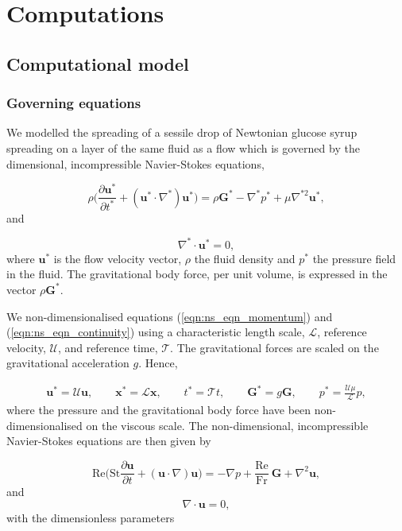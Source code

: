 \documentclass[aip,graphicx]{revtex4-1}
\newcommand{\sym}[1]{\text{#1}}
\newcommand{\pder}[2][]{\frac{\partial#1}{\partial#2}}
\newcommand{\vect}[1]{\bm{#1}}
\begin{document}
\section{Computations}

\subsection{Computational model}

\subsubsection{Governing equations}

We modelled the spreading of a sessile drop of Newtonian glucose syrup spreading on a layer of the same fluid as a flow which is governed by the dimensional, incompressible Navier-Stokes equations,

\begin{equation}
 \rho \Bigg( \pder[\vect{u}^*]{t^*} + (\vect{u}^* \cdot \nabla^*) \vect{u}^* \Bigg) = \rho \vect{G}^* - \nabla^* p^* + \mu \nabla^{*2} \vect{u}^*,
 \label{eqn:ns_eqn_momentum}
\end{equation}
and

\begin{equation}
 \nabla^* \cdot \vect{u}^* = 0,
 \label{eqn:ns_eqn_continuity}
\end{equation}
where $\vect{u}^*$ is the flow velocity vector, $\rho$ the fluid density and $p^*$ the pressure field in the fluid. 
The gravitational body force, per unit volume, is expressed in the vector $\rho \vect{G}^*$. 

We non-dimensionalised equations (\ref{eqn:ns_eqn_momentum}) and (\ref{eqn:ns_eqn_continuity}) using a characteristic length scale, $\mathcal{L}$, reference velocity, $\mathcal{U}$, and reference time, $\mathcal{T}$. 
The gravitational forces are scaled on the gravitational acceleration $g$. 
Hence,

\begin{gather}
 \vect{u}^*=\mathcal{U} \vect{u}, \qquad \vect{x}^*=\mathcal{L} \vect{x}, \qquad t^*= \mathcal{T} t, \qquad \vect{G}^*=g \vect{G}, \qquad p^*= \frac{\mathcal{U} \mu}{\mathcal{L}} p,
 \label{eqn:ns_eqn_nondim}
\end{gather}
where the pressure and the gravitational body force have been non-dimensionalised on the viscous scale.
The non-dimensional, incompressible Navier-Stokes equations are then given by

\begin{equation}
 \sym{Re} \Bigg( \sym{St} \pder[\vect{u}]{t} + (\vect{u} \cdot \nabla) \vect{u} \Bigg) = - \nabla p + \frac{\sym{Re}}{\sym{Fr}} \: \vect{G} + \nabla^2 \vect{u},
 \label{eqn:ns_eqn_momentum_nondim}
\end{equation}
and
\begin{equation}
 \nabla \cdot \vect{u} = 0,
 \label{eqn:ns_eqn_continuity_nondim}
\end{equation}
with the dimensionless parameters
\end{document}
